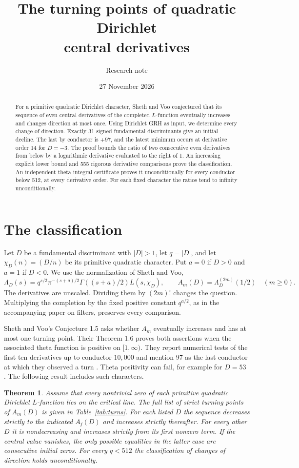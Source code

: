 \documentclass[11pt]{article}
\title{The turning points of quadratic Dirichlet\texorpdfstring{\\}{ }central derivatives}
\author{Research note}
\date{27 November 2026}
\newtheorem{theorem}{Theorem}
\newcommand{\LL}{\Lambda}
\numberwithin{equation}{section}
\begin{document}
\maketitle
\begin{abstract}
For a primitive quadratic Dirichlet character, Sheth and Voo conjectured that its sequence of even central derivatives of the completed $L$-function eventually increases and changes direction at most once. Using Dirichlet GRH as input, we determine every change of direction. Exactly 31 signed fundamental discriminants give an initial decline. The last by conductor is $+97$, and the latest minimum occurs at derivative order 14 for $D=-3$. The proof bounds the ratio of two consecutive even derivatives from below by a logarithmic derivative evaluated to the right of 1. An increasing explicit lower bound and 555 rigorous derivative comparisons prove the classification. An independent theta-integral certificate proves it unconditionally for every conductor below 512, at every derivative order. For each fixed character the ratios tend to infinity unconditionally.
\end{abstract}

\section{The classification}
Let $D$ be a fundamental discriminant with $|D|>1$, let $q=|D|$, and let $\chi_D(n)=(D/n)$ be its primitive quadratic character. Put $a=0$ if $D>0$ and $a=1$ if $D<0$. We use the normalization of Sheth and Voo,
\[
 \LL_D(s)=q^{s/2}\pi^{-(s+a)/2}\Gamma((s+a)/2)L(s,\chi_D),
 \qquad A_m(D)=\LL_D^{(2m)}(1/2)\quad(m\ge0).
\]
The derivatives are unscaled. Dividing them by $(2m)!$ changes the question. Multiplying the completion by the fixed positive constant $q^{a/2}$, as in the accompanying paper on filters, preserves every comparison.

Sheth and Voo's Conjecture 1.5 asks whether $A_m$ eventually increases and has at most one turning point. Their Theorem 1.6 proves both assertions when the associated theta function is positive on $[1,\infty)$. They report numerical tests of the first ten derivatives up to conductor $10{,}000$ and mention 97 as the last conductor at which they observed a turn \cite{SV}. Theta positivity can fail, for example for $D=53$ \cite{LM}. The following result includes such characters.

\begin{theorem}\label{th:classification}
Assume that every nontrivial zero of each primitive quadratic Dirichlet $L$-function lies on the critical line. The full list of strict turning points of $A_m(D)$ is given in Table~\ref{tab:turns}. For each listed $D$ the sequence decreases strictly to the indicated $A_j(D)$ and increases strictly thereafter. For every other $D$ it is nondecreasing and increases strictly from its first nonzero term. If the central value vanishes, the only possible equalities in the latter case are consecutive initial zeros. For every $q<512$ the classification of changes of direction holds unconditionally.
\end{theorem}
\end{document}
